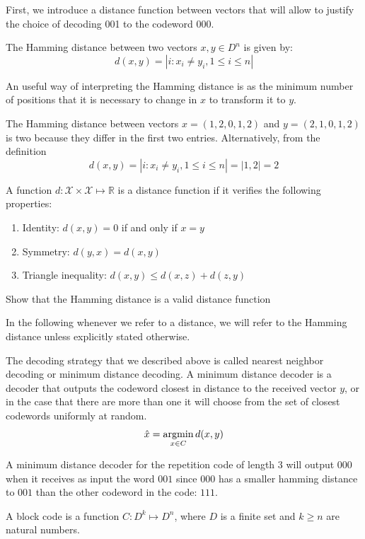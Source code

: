 First, we introduce a distance function between vectors that will allow to justify the choice of decoding 001 to the codeword 000.
\begin{definition}
The Hamming distance between two vectors $x,y\in D^n$ is given by:
\begin{equation}
d(x,y)=|{i:x_i\neq y_i, 1\leq i\leq n}|
\end{equation}
\end{definition}
An useful way of interpreting the Hamming distance is as the minimum number of positions that it is necessary to change in $x$ to transform it to $y$.
\begin{example}
The Hamming distance between vectors $x=(1,2,0,1,2)$ and $y=(2,1,0,1,2)$ is two because they differ in the first two entries. Alternatively, from the definition
\begin{equation}
d(x,y)=|{i:x_i\neq y_i, 1\leq i\leq n}|=|{1,2}|=2
\end{equation}\end{example}
A function $d:\mathcal X\times \mathcal X\mapsto \mathbb R$ is a distance function if it verifies the following properties:
\begin{enumerate}
\item Identity: $d(x,y)=0$ if and only if $x=y$
\item Symmetry: $d(y,x)=d(x,y)$
\item Triangle inequality: $d(x,y)\leq d(x,z)+d(z,y)$
\end{enumerate}
\begin{exercise}
Show that the Hamming distance is a valid distance function
\end{exercise}
In the following whenever we refer to a distance, we will refer to the Hamming distance unless explicitly stated otherwise.

The decoding strategy that we described above is called nearest neighbor decoding or minimum distance decoding. A minimum distance decoder is a decoder that outputs the codeword closest in distance to the received vector $y$, or in the case that there are more than one it will choose from the set of closest codewords uniformly at random.
\begin{equation}
\hat x = \operatorname*{argmin}_{x\in C}d(x,y)
\end{equation}
\begin{example}
A minimum distance decoder for the repetition code of length 3 will output 000 when it receives as input the word $001$ since $000$ has a smaller hamming distance to $001$ than the other codeword in the code: $111$.
\end{example}
\begin{definition}
A block code is a function $C:D^k\mapsto D^n$, where $D$ is a finite set and $k\geq n$ are natural numbers.
\end{definition}

